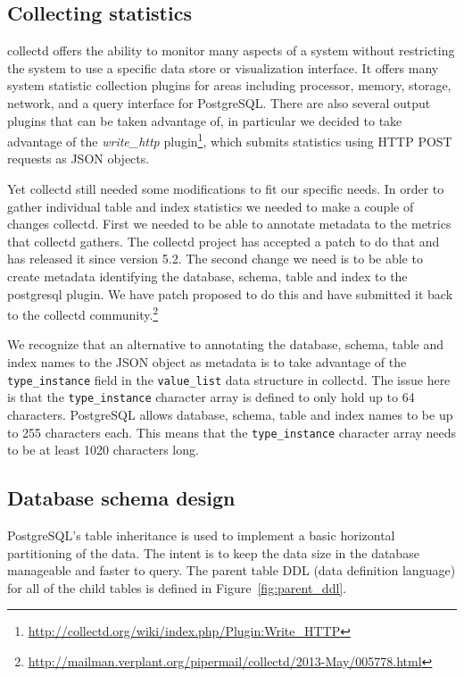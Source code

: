 \documentclass[twocolumn,letterpaper]{article}
\begin{document}
\subsection{Collecting statistics}

collectd offers the ability to monitor many aspects of a system without
restricting the system to use a specific data store or visualization interface.
It offers many system statistic collection plugins for areas including
processor, memory, storage, network, and a query interface for PostgreSQL.
There are also several output plugins that can be taken advantage of, in
particular we decided to take advantage of the \textit{write\_http}
plugin\footnote{\url{http://collectd.org/wiki/index.php/Plugin:Write_HTTP}},
which submits statistics using HTTP POST requests as JSON objects.

Yet collectd still needed some modifications to fit our specific needs.  In
order to gather individual table and index statistics we needed to make a
couple of changes collectd. First we needed to be able to annotate metadata to
the metrics that collectd gathers.  The collectd project has accepted a patch
to do that and has released it since version 5.2.  The second change we need is
to be able to create metadata identifying the database, schema, table and index
to the postgresql plugin.  We have patch proposed to do this and have submitted
it back to the collectd
community.\footnote{\url{http://mailman.verplant.org/pipermail/collectd/2013-May/005778.html}} 

We recognize that an alternative to annotating the database, schema, table and
index names to the JSON object as metadata is to take advantage of the
\texttt{type\_instance} field in the \texttt{value\_list} data structure in
collectd.  The issue here is that the \texttt{type\_instance} character array
is defined to only hold up to 64 characters.  PostgreSQL allows database,
schema, table and index names to be up to 255 characters each.  This means
that the \texttt{type\_instance} character array needs to be at least 1020
characters long.

\subsection{Database schema design}

PostgreSQL's table inheritance is used to implement a basic horizontal
partitioning of the data.  The intent is to keep the data size in the database
manageable and faster to query.  The parent table DDL (data definition
language) for all of the child tables is defined in
Figure~\ref{fig:parent_ddl}.
\end{document}
